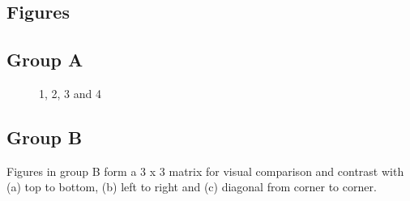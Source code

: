 \subsection{Figures}

\subsection{Group A}

\begin{figure}[H]
	\centering
	\begin{minipage}[b]{0.5\linewidth}
	\end{minipage}\hfill
	\begin{minipage}[b]{0.5\linewidth}
	\end{minipage}\hfill	
	\begin{minipage}[b]{0.5\linewidth}
	\end{minipage}\hfill
	\begin{minipage}[b]{0.5\linewidth}
	\end{minipage}\hfill
	\caption{1, 2, 3 and 4}
	\label{fig:Figure1}
\end{figure} 

\subsection{Group B}

Figures in group B form a 3 x 3 matrix for visual comparison and contrast with (a) top to bottom, (b) left to right and (c) diagonal from corner to corner.

